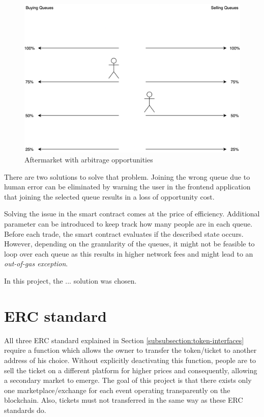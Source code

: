 \begin{figure}[H]
    \centering
    \includegraphics[width=16cm]{figures/aftermarket-arbitrage.png}
    \caption{Aftermarket with arbitrage opportunities}
    \label{fig:aftermarket-arbitrage}
\end{figure}

There are two solutions to solve that problem. Joining the wrong queue due to human error can be eliminated by warning the user in the frontend application that joining the selected queue results in a loss of opportunity cost. 

Solving the issue in the smart contract comes at the price of efficiency. Additional parameter can be introduced to keep track how many people are in each queue. Before each trade, the smart contract evaluates if the described state occurs. However, depending on the granularity of the queues, it might not be feasible to loop over each queue as this results in higher network fees and might lead to an 
\textit{out-of-gas exception}.

In this project, the ... solution was chosen.

\section{ERC standard}
All three ERC standard explained in Section \ref{subsubsection:token-interfaces} require a function which allows the owner to transfer the token/ticket to another address of his choice. Without explicitly deactivating this function, people are to sell the ticket on a different platform for higher prices and consequently, allowing a secondary market to emerge. The goal of this project is that there exists only one marketplace/exchange for each event operating transparently on the blockchain. Also, tickets must not transferred in the same way as these ERC standards do.


